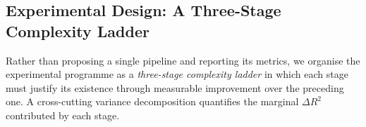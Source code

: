 \subsection{Experimental Design: A Three-Stage Complexity Ladder}
\label{sec:intro:approach}

Rather than proposing a single pipeline and reporting its metrics, we organise
the experimental programme as a \emph{three-stage complexity ladder} in which
each stage must justify its existence through measurable improvement over the
preceding one. A cross-cutting variance decomposition quantifies the marginal
$\Delta R^2$ contributed by each stage.

